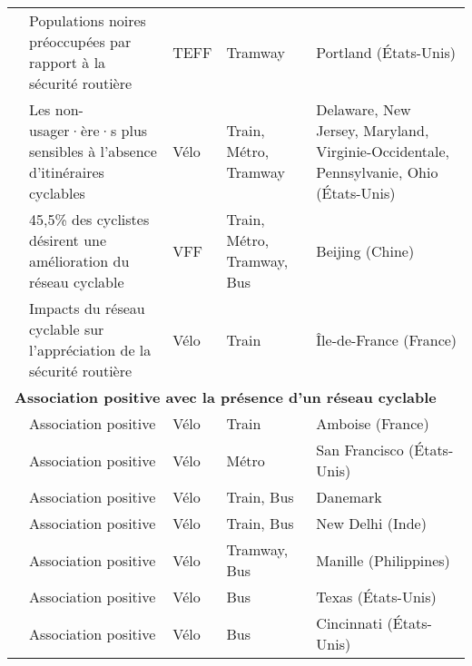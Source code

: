 \begin{longtable}{p{3cm}p{4cm}p{1.5cm}p{1.8cm}p{2.3cm}}
    \small{\textcite{mcqueen_assessing_2022}}\index{McQueen, Michael|pagebf} & \small{Populations noires préoccupées par rapport à la sécurité routière} & \small{TEFF} & \small{Tramway} & \small{Portland (États-Unis)}\\
    \small{\textcite{bopp_examining_2015}}\index{Bopp, Melissa|pagebf} & \small{Les non-usager·ère·s plus sensibles à l'absence d'itinéraires cyclables} & \small{Vélo} & \small{Train, Métro, Tramway} & \small{Delaware, New Jersey, Maryland, Virginie-Occidentale, Pennsylvanie, Ohio (États-Unis)}\\
    \small{\textcite{fan_how_2019}}\index{Fan, Aihua|pagebf} & \small{45,5\% des cyclistes désirent une amélioration du réseau cyclable} & \small{VFF} & \small{Train, Métro, Tramway, Bus} & \small{Beijing (Chine)}\\
    \small{\textcite{stransky_quartiers_2017}}\index{Stransky, Václav|pagebf} & \small{Impacts du réseau cyclable sur l'appréciation de la sécurité routière} & \small{Vélo} & \small{Train} & \small{Île-de-France (France)}\\
    \hline
\multicolumn{5}{l}{\textbf{Association positive avec la présence d'un réseau cyclable}}\\
    \small{\textcite{midenet_modal_2018}}\index{Midenet, Sophie|pagebf} & \small{Association positive} & \small{Vélo} & \small{Train} & \small{Amboise (France)}\\
    \small{\textcite{cervero_bike-and-ride_2013}}\index{Cervero, Robert|pagebf} & \small{Association positive} & \small{Vélo} & \small{Métro} & \small{San Francisco (États-Unis)}\\
    \small{\textcite{nielsen_bikeability_2018}}\index{Nielsen, Thomas Alexander Sick|pagebf} & \small{Association positive} & \small{Vélo} & \small{Train, Bus} & \small{Danemark}\\
    \small{\textcite{mohanty_effect_2017}}\index{Mohanty, Sudatta|pagebf} & \small{Association positive} & \small{Vélo} & \small{Train, Bus} & \small{New Delhi (Inde)}\\
    \small{\textcite{fillone_i_2018}}\index{Fillone, Alexis|pagebf} & \small{Association positive} & \small{Vélo} & \small{Tramway, Bus} & \small{Manille (Philippines)}\\
    \small{\textcite{taylor_analysis_1996}}\index{Taylor, Dean|pagebf} & \small{Association positive} & \small{Vélo} & \small{Bus} & \small{Texas (États-Unis)}\\
    \small{\textcite{zuo_determining_2018}}\index{Zuo, Ting|pagebf} & \small{Association positive} & \small{Vélo} & \small{Bus} & \small{Cincinnati (États-Unis)}\\

\end{longtable}
